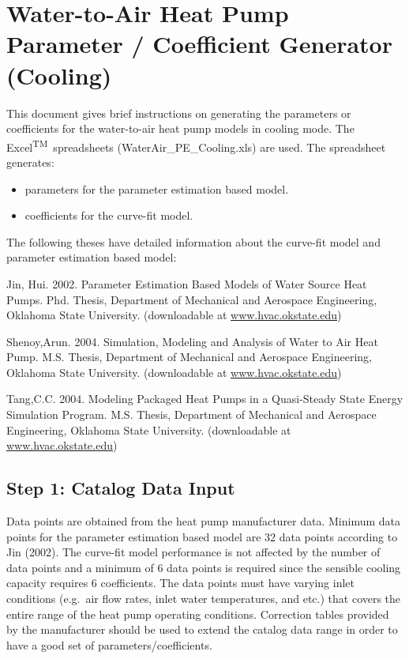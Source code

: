 \section{Water-to-Air Heat Pump Parameter / Coefficient Generator (Cooling)}\label{water-to-air-heat-pump-parameter-coefficient-generator-cooling}

This document gives brief instructions on generating the parameters or coefficients for the water-to-air heat pump models in cooling mode. The Excel\textsuperscript{TM}\ spreadsheets (WaterAir\_PE\_Cooling.xls) are used. The spreadsheet generates:

\begin{itemize}
\item
  parameters for the parameter estimation based model.
\item
  coefficients for the curve-fit model.
\end{itemize}

The following theses have detailed information about the curve-fit model and parameter estimation based model:

Jin, Hui. 2002. Parameter Estimation Based Models of Water Source Heat Pumps. Phd. Thesis, Department of Mechanical and Aerospace Engineering, Oklahoma State University. (downloadable at \href{http://www.hvac.okstate.edu}{www.hvac.okstate.edu})

Shenoy,Arun. 2004. Simulation, Modeling and Analysis of Water to Air Heat Pump. M.S. Thesis, Department of Mechanical and Aerospace Engineering, Oklahoma State University. (downloadable at \href{http://www.hvac.okstate.edu}{www.hvac.okstate.edu})

Tang,C.C. 2004. Modeling Packaged Heat Pumps in a Quasi-Steady State Energy Simulation Program. M.S. Thesis, Department of Mechanical and Aerospace Engineering, Oklahoma State University. (downloadable at \href{http://www.hvac.okstate.edu}{www.hvac.okstate.edu})

\subsection{Step 1: Catalog Data Input}\label{step-1-catalog-data-input-000}

Data points are obtained from the heat pump manufacturer data. Minimum data points for the parameter estimation based model are 32 data points according to Jin (2002). The curve-fit model performance is not affected by the number of data points and a minimum of 6 data points is required since the sensible cooling capacity requires 6 coefficients. The data points must have varying inlet conditions (e.g.~air flow rates, inlet water temperatures, and etc.) that covers the entire range of the heat pump operating conditions. Correction tables provided by the manufacturer should be used to extend the catalog data range in order to have a good set of parameters/coefficients.

